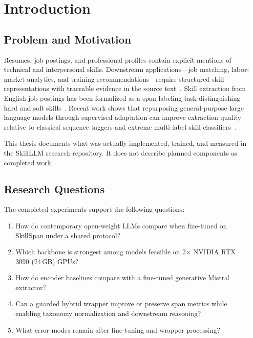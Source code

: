 \documentclass[12pt,oneside]{report}
\begin{document}
\tableofcontents
\listoftables

\chapter{Introduction}
\label{ch:intro}

\section{Problem and Motivation}

Resumes, job postings, and professional profiles contain explicit mentions of technical and interpersonal skills.
Downstream applications---job matching, labor-market analytics, and training recommendations---require structured skill representations with traceable evidence in the source text~\cite{senger2024survey,otani2025hrsurvey}.
Skill extraction from English job postings has been formalized as a span labeling task distinguishing hard and soft skills~\cite{zhang2022skillspan}.
Recent work shows that repurposing general-purpose large language models through supervised adaptation can improve extraction quality relative to classical sequence taggers and extreme multi-label skill classifiers~\cite{herandi2024skillllm,nguyen2024rethinking,zhang2024nnose}.

This thesis documents what was actually implemented, trained, and measured in the SkillLLM research repository.
It does not describe planned components as completed work.

\section{Research Questions}

The completed experiments support the following questions:

\begin{enumerate}
  \item How do contemporary open-weight LLMs compare when fine-tuned on SkillSpan under a shared protocol?
  \item Which backbone is strongest among models feasible on 2$\times$ NVIDIA RTX 3090 (24\,GB) GPUs?
  \item How do encoder baselines compare with a fine-tuned generative Mistral extractor?
  \item Can a guarded hybrid wrapper improve or preserve span metrics while enabling taxonomy normalization and downstream reasoning?
  \item What error modes remain after fine-tuning and wrapper processing?
\end{enumerate}
\end{document}
